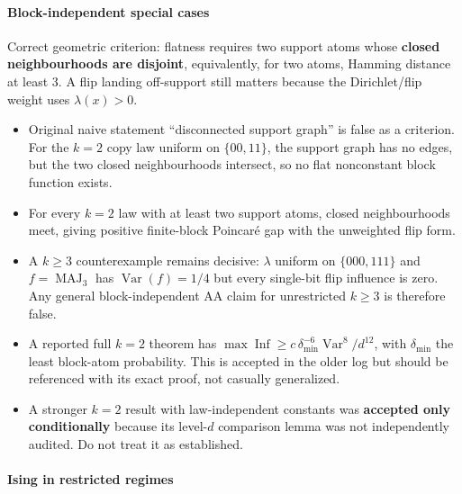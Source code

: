 \paragraph{Block-independent special cases}\label{block-independent-special-cases}

Correct geometric criterion: flatness requires two support atoms whose \textbf{closed neighbourhoods are disjoint}, equivalently, for two atoms, Hamming distance at least 3. A flip landing off-support still matters because the Dirichlet/flip weight uses \(\lambda(x)>0\).

\begin{itemize}
\tightlist
\item
  Original naive statement ``disconnected support graph'' is false as a criterion. For the \(k=2\) copy law uniform on \(\{00,11\}\), the support graph has no edges, but the two closed neighbourhoods intersect, so no flat nonconstant block function exists.
\item
  For every \(k=2\) law with at least two support atoms, closed neighbourhoods meet, giving positive finite-block Poincaré gap with the unweighted flip form.
\item
  A \(k\ge3\) counterexample remains decisive: \(\lambda\) uniform on \(\{000,111\}\) and \(f=\operatorname{MAJ}_3\) has \(\operatorname{Var}(f)=1/4\) but every single-bit flip influence is zero. Any general block-independent AA claim for unrestricted \(k\ge3\) is therefore false.
\item
  A reported full \(k=2\) theorem has
  \(\max\operatorname{Inf}\ge c\,\delta_{\min}^{-6}\operatorname{Var}^8/d^{12}\),
  with \(\delta_{\min}\) the least block-atom probability. This is accepted in the older log but should be referenced with its exact proof, not casually generalized.
\item
  A stronger \(k=2\) result with law-independent constants was \textbf{accepted only conditionally} because its level-\(d\) comparison lemma was not independently audited. Do not treat it as established.
\end{itemize}

\paragraph{Ising in restricted regimes}\label{ising-in-restricted-regimes}

